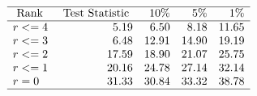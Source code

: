 \documentclass[10pt,a4paper]{article}
\begin{document}
	$$
	\begin{array}{lrrrr}
		\hline \text { Rank } & \text { Test Statistic } & 10 \% & 5 \% & 1 \% \\
		\hline r<=4 & 5.19 & 6.50 & 8.18 & 11.65 \\
		r<=3 & 6.48 & 12.91 & 14.90 & 19.19 \\
		r<=2 & 17.59 & 18.90 & 21.07 & 25.75 \\
		r<=1 & 20.16 & 24.78 & 27.14 & 32.14 \\
		r=0 & 31.33 & 30.84 & 33.32 & 38.78 \\
		\hline
	\end{array}
	$$
	
	
\end{document}
